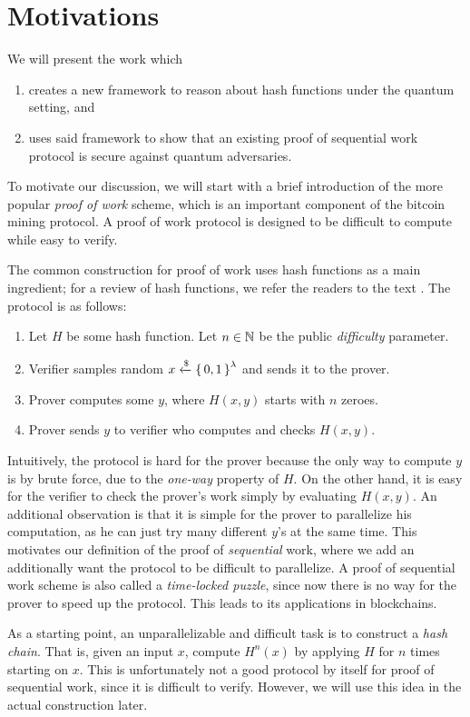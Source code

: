 \section{Motivations}

We will present the work \cite{main-result} which
\begin{enumerate}
	\item creates a new framework to reason about hash functions under the quantum setting, and
	\item uses said framework to show that an existing proof of sequential work protocol is secure against quantum adversaries.
\end{enumerate}
To motivate our discussion, we will start with a brief introduction of the more popular \emph{proof of work} scheme,
which is an important component of the bitcoin mining protocol.
A proof of work protocol is designed to be difficult to compute while easy to verify.

The common construction for proof of work uses hash functions as a main ingredient; for a review of hash functions, we refer the readers to the text \cite{intro-algo}.
The protocol is as follows:
\begin{enumerate}
	\item
		Let $H$ be some hash function.
		Let $n\in\mathbb{N}$ be the public \emph{difficulty} parameter.
	\item Verifier samples random $x\xleftarrow{\$}\set{0, 1}^{\lambda}$ and sends it to the prover.
	\item Prover computes some $y$, where $H(x, y)$ starts with $n$ zeroes.
	\item Prover sends $y$ to verifier who computes and checks $H(x, y)$.
\end{enumerate}

Intuitively, the protocol is hard for the prover because the only way to compute $y$ is by brute force,
due to the \emph{one-way} property of $H$.
On the other hand, it is easy for the verifier to check the prover's work simply by evaluating $H(x, y)$.
An additional observation is that it is simple for the prover to parallelize his computation,
as he can just try many different $y$'s at the same time.
This motivates our definition of the proof of \emph{sequential} work,
where we add an additionally want the protocol to be difficult to parallelize.
A proof of sequential work scheme is also called a \emph{time-locked puzzle},
since now there is no way for the prover to speed up the protocol.
This leads to its applications in blockchains.

As a starting point, an unparallelizable and difficult task is to construct a \emph{hash chain}.
That is, given an input $x$, compute $H^n(x)$ by applying $H$ for $n$ times starting on $x$.
This is unfortunately not a good protocol by itself for proof of sequential work, since it is difficult to verify.
However, we will use this idea in the actual construction later.
